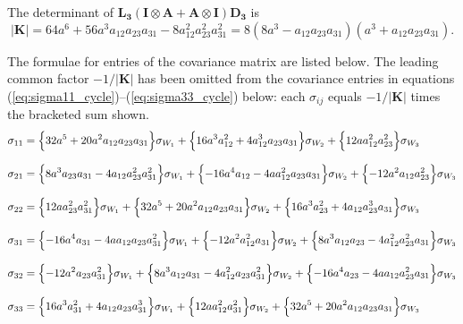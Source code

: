 \documentclass{article}
\begin{document}
The determinant of $\mathbf{L_3}(\mathbf{I} \otimes \mathbf{A} + \mathbf{A} \otimes \mathbf{I}) \mathbf{D_3}$ is
\begin{equation}
|\mathbf{K}| = 64a^6+56a^3a_{12}a_{23}a_{31}-8a_{12}^2a_{23}^2a_{31}^2
= 8\left(8a^3-a_{12}a_{23}a_{31}\right)\left(a^3+a_{12}a_{23}a_{31}\right).
\label{eq:detK_cycle}
\end{equation}

The formulae for entries of the covariance matrix are listed below.
The leading common factor $-1/|\mathbf{K}|$ has been omitted from the
covariance entries in equations
(\ref{eq:sigma11_cycle})--(\ref{eq:sigma33_cycle}) below: each
$\sigma_{ij}$ equals $-1/|\mathbf{K}|$ times the bracketed sum shown.
\begin{align}
\sigma_{11}&= \Bigl\{ 32a^5+20a^2a_{12}a_{23}a_{31} \Bigr\} \sigma_{W_{1}}
+ \Bigl\{ 16a^3a_{12}^2+4a_{12}^3a_{23}a_{31} \Bigr\} \sigma_{W_{2}}
+ \Bigl\{ 12aa_{12}^2a_{23}^2 \Bigr\} \sigma_{W_{3}} \label{eq:sigma11_cycle} \\[8pt]
\sigma_{21}&= \Bigl\{ 8a^3a_{23}a_{31}-4a_{12}a_{23}^2a_{31}^2 \Bigr\} \sigma_{W_{1}}
+ \Bigl\{ -16a^4a_{12}-4aa_{12}^2a_{23}a_{31} \Bigr\} \sigma_{W_{2}}
+ \Bigl\{ -12a^2a_{12}a_{23}^2 \Bigr\} \sigma_{W_{3}} \label{eq:sigma21_cycle} \\[8pt]
\sigma_{22}&= \Bigl\{ 12aa_{23}^2a_{31}^2 \Bigr\} \sigma_{W_{1}}
+ \Bigl\{ 32a^5+20a^2a_{12}a_{23}a_{31} \Bigr\} \sigma_{W_{2}}
+ \Bigl\{ 16a^3a_{23}^2+4a_{12}a_{23}^3a_{31} \Bigr\} \sigma_{W_{3}} \label{eq:sigma22_cycle} \\[8pt]
\sigma_{31}&= \Bigl\{ -16a^4a_{31}-4aa_{12}a_{23}a_{31}^2 \Bigr\} \sigma_{W_{1}}
+ \Bigl\{ -12a^2a_{12}^2a_{31} \Bigr\} \sigma_{W_{2}}
+ \Bigl\{ 8a^3a_{12}a_{23}-4a_{12}^2a_{23}^2a_{31} \Bigr\} \sigma_{W_{3}} \label{eq:sigma31_cycle} \\[8pt]
\sigma_{32}&= \Bigl\{ -12a^2a_{23}a_{31}^2 \Bigr\} \sigma_{W_{1}}
+ \Bigl\{ 8a^3a_{12}a_{31}-4a_{12}^2a_{23}a_{31}^2 \Bigr\} \sigma_{W_{2}}
+ \Bigl\{ -16a^4a_{23}-4aa_{12}a_{23}^2a_{31} \Bigr\} \sigma_{W_{3}} \label{eq:sigma32_cycle} \\[8pt]
\sigma_{33}&= \Bigl\{ 16a^3a_{31}^2+4a_{12}a_{23}a_{31}^3 \Bigr\} \sigma_{W_{1}}
+ \Bigl\{ 12aa_{12}^2a_{31}^2 \Bigr\} \sigma_{W_{2}}
+ \Bigl\{ 32a^5+20a^2a_{12}a_{23}a_{31} \Bigr\} \sigma_{W_{3}} \label{eq:sigma33_cycle}
\end{align}
\end{document}

